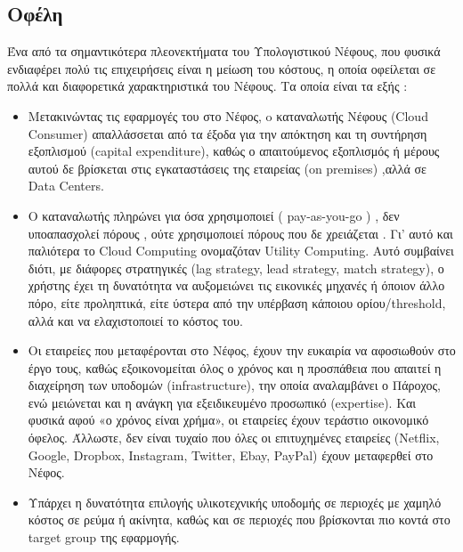 \documentclass{article}
\begin{document}
\subsection{Οφέλη}
Ένα από τα σημαντικότερα πλεονεκτήματα του Υπολογιστικού Νέφους, που φυσικά ενδιαφέρει πολύ τις επιχειρήσεις είναι η μείωση του κόστους, η οποία οφείλεται σε πολλά και διαφορετικά χαρακτηριστικά του Νέφους. Τα οποία είναι τα εξής :
\begin{itemize}
\item	Μετακινώντας τις εφαρμογές του στο Νέφος, o καταναλωτής Νέφους (Cloud Consumer) απαλλάσσεται από τα έξοδα για την απόκτηση και τη συντήρηση εξοπλισμού (capital expenditure), καθώς ο απαιτούμενος εξοπλισμός ή μέρους αυτού δε βρίσκεται στις εγκαταστάσεις της εταιρείας (on premises) ,αλλά σε Data Centers.

\item	Ο καταναλωτής πληρώνει για όσα χρησιμοποιεί ( pay-as-you-go ) , δεν υποαπασχολεί πόρους , ούτε χρησιμοποιεί πόρους που δε χρειάζεται . Γι’ αυτό και παλιότερα το Cloud Computing ονομαζόταν Utility Computing. Αυτό συμβαίνει διότι, με διάφορες στρατηγικές (lag strategy, lead strategy, match strategy), ο χρήστης έχει τη δυνατότητα να αυξομειώνει τις εικονικές μηχανές ή όποιον άλλο πόρο, είτε προληπτικά, είτε ύστερα από την υπέρβαση κάποιου ορίου/threshold, αλλά και να ελαχιστοποιεί το κόστος του.

\item	Οι εταιρείες που μεταφέρονται στο Νέφος, έχουν την ευκαιρία να αφοσιωθούν στο έργο τους, καθώς εξοικονομείται όλος ο χρόνος και η προσπάθεια που απαιτεί η διαχείρηση των υποδομών (infrastructure), την οποία αναλαμβάνει ο Πάροχος, ενώ μειώνεται και η ανάγκη για εξειδικευμένο προσωπικό (expertise). Και φυσικά αφού «ο χρόνος είναι χρήμα», οι εταιρείες έχουν τεράστιο οικονομικό όφελος. Άλλωστε, δεν είναι τυχαίο που όλες οι επιτυχημένες εταιρείες (Netflix, Google, Dropbox, Instagram, Twitter, Ebay, PayPal) έχουν μεταφερθεί στο Νέφος.

\item	Υπάρχει η δυνατότητα επιλογής υλικοτεχνικής υποδομής σε περιοχές με χαμηλό κόστος σε ρεύμα ή ακίνητα, καθώς και σε περιοχές που βρίσκονται πιο κοντά στο target group της εφαρμογής.

\end{itemize}
\end{document}
